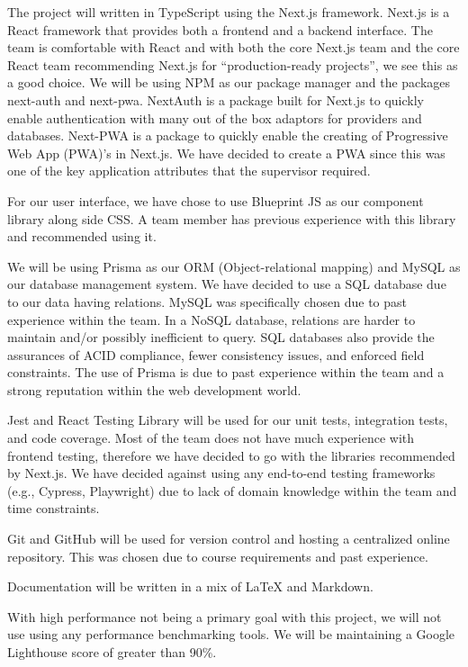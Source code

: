 \documentclass{article}
\begin{document}
The project will written in TypeScript using the Next.js framework. Next.js is a React framework
that provides both a frontend and a backend interface. The team is comfortable with React and with
both the core Next.js team and the core React team recommending Next.js for
``production-ready projects'', we see this as a good choice. We will be using NPM as our package
manager and the packages next-auth and next-pwa. NextAuth is a package built for Next.js to quickly
enable authentication with many out of the box adaptors for providers and databases. Next-PWA is a
package to quickly enable the creating of Progressive Web App (PWA)'s in Next.js. We have decided to
create a PWA since this was one of the key application attributes that the supervisor required.

For our user interface, we have chose to use Blueprint JS as our component library along side CSS. A
team member has previous experience with this library and recommended using it.

We will be using Prisma as our ORM (Object-relational mapping) and MySQL as our database management
system. We have decided to use a SQL database due to our data having relations. MySQL was
specifically chosen due to past experience within the team. In a NoSQL database, relations are
harder to maintain and/or possibly inefficient to query. SQL databases also provide the assurances
of ACID compliance, fewer consistency issues, and enforced field constraints. The use of Prisma is
due to past experience within the team and a strong reputation within the web development world.

Jest and React Testing Library will be used for our unit tests, integration tests, and code
coverage. Most of the team does not have much experience with frontend testing, therefore we have
decided to go with the libraries recommended by Next.js. We have decided against using any
end-to-end testing frameworks (e.g., Cypress, Playwright) due to lack of domain knowledge within the
team and time constraints.

Git and GitHub will be used for version control and hosting a centralized online repository. This
was chosen due to course requirements and past experience.

Documentation will be written in a mix of \LaTeX{} and Markdown.

With high performance not being a primary goal with this project, we will not use using any
performance benchmarking tools. We will be maintaining a Google Lighthouse score of greater than
90\%.
\end{document}
